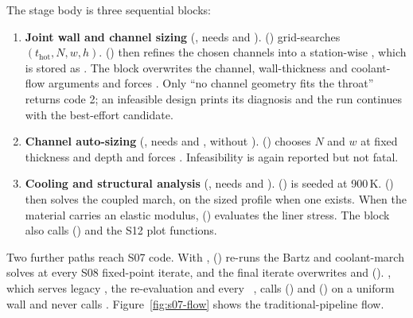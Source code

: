 The stage body is three sequential blocks:

\begin{enumerate}
\item \textbf{Joint wall and channel sizing} (, needs  and ).  () grid-searches $(t_{\mathrm{hot}}, N, w, h)$.  () then refines the chosen channels into a station-wise , which is stored as . The block overwrites the channel, wall-thickness and coolant-flow arguments and forces . Only ``no channel geometry fits the throat'' returns code 2; an infeasible design prints its diagnosis and the run continues with the best-effort candidate.
\item \textbf{Channel auto-sizing} (, needs  and , without ).  () chooses $N$ and $w$ at fixed thickness and depth and forces . Infeasibility is again reported but not fatal.
\item \textbf{Cooling and structural analysis} (, needs  and ).  () is seeded at 900\,K.  () then solves the coupled march, on the sized profile when one exists. When the material carries an elastic modulus,  () evaluates the liner stress. The block also calls  () and the S12 plot functions.
\end{enumerate}

Two further paths reach S07 code. With ,  () re-runs the Bartz and coolant-march solves at every S08 fixed-point iterate, and the final iterate overwrites  and  (). , which serves legacy , the  re-evaluation and every ~, calls  () and  () on a uniform wall and never calls . Figure~\ref{fig:s07-flow} shows the traditional-pipeline flow.



